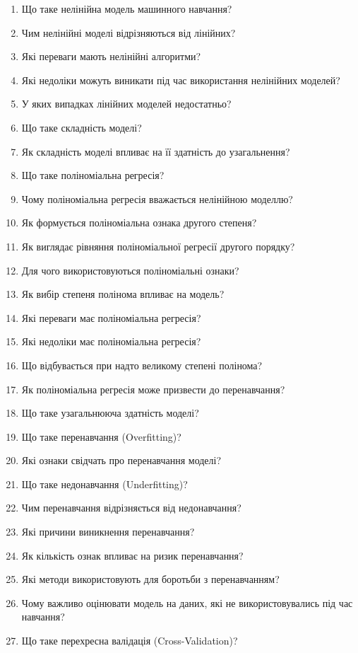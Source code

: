 \begin{enumerate}
\item Що таке нелінійна модель машинного навчання?
\item Чим нелінійні моделі відрізняються від лінійних?
\item Які переваги мають нелінійні алгоритми?
\item Які недоліки можуть виникати під час використання нелінійних моделей?
\item У яких випадках лінійних моделей недостатньо?
\item Що таке складність моделі?
\item Як складність моделі впливає на її здатність до узагальнення?
\item Що таке поліноміальна регресія?
\item Чому поліноміальна регресія вважається нелінійною моделлю?
\item Як формується поліноміальна ознака другого степеня?
\item Як виглядає рівняння поліноміальної регресії другого порядку?
\item Для чого використовуються поліноміальні ознаки?
\item Як вибір степеня полінома впливає на модель?
\item Які переваги має поліноміальна регресія?
\item Які недоліки має поліноміальна регресія?
\item Що відбувається при надто великому степені полінома?
\item Як поліноміальна регресія може призвести до перенавчання?
\item Що таке узагальнююча здатність моделі?
\item Що таке перенавчання (Overfitting)?
\item Які ознаки свідчать про перенавчання моделі?
\item Що таке недонавчання (Underfitting)?
\item Чим перенавчання відрізняється від недонавчання?
\item Які причини виникнення перенавчання?
\item Як кількість ознак впливає на ризик перенавчання?
\item Які методи використовують для боротьби з перенавчанням?
\item Чому важливо оцінювати модель на даних, які не використовувались під час навчання?
\item Що таке перехресна валідація (Cross-Validation)?

\end{enumerate}
